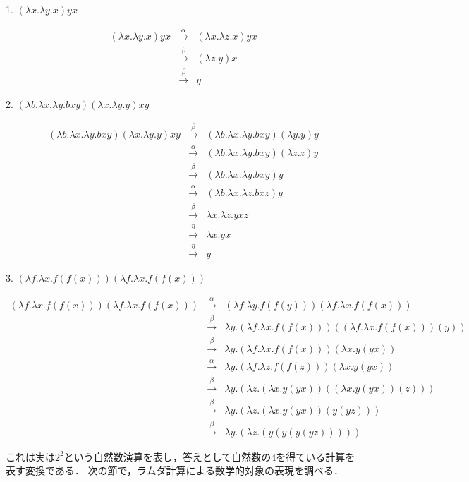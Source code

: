 \documentclass[uplatex, dvipdfmx]{jsreport}
\begin{document}
\begin{example}
    1. $(\lambda x.\lambda y.x)yx$

    \begin{eqnarray*}
        (\lambda x.\lambda y.x)yx &\xrightarrow{\alpha}& (\lambda x.\lambda z.x)yx \\
        &\xrightarrow{\beta}& (\lambda z.y)x \\
        &\xrightarrow{\beta}& y
    \end{eqnarray*}

    2. $(\lambda b.\lambda x.\lambda y.bxy)(\lambda x.\lambda y.y)xy$

    \begin{eqnarray*}
        (\lambda b.\lambda x.\lambda y.bxy)(\lambda x.\lambda y.y)xy &\xrightarrow{\beta}& (\lambda b.\lambda x.\lambda y.bxy)(\lambda y.y)y \\
        &\xrightarrow{\alpha}& (\lambda b.\lambda x.\lambda y.bxy)(\lambda z.z)y \\
        &\xrightarrow{\beta}& (\lambda b.\lambda x.\lambda y.bxy)y \\
        &\xrightarrow{\alpha}& (\lambda b.\lambda x.\lambda z.bxz)y \\
        &\xrightarrow{\beta}& \lambda x.\lambda z.yxz \\
        &\xrightarrow{\eta}& \lambda x.yx \\
        &\xrightarrow{\eta}& y
    \end{eqnarray*}

    3. $(\lambda f.\lambda x.f(f(x)))(\lambda f.\lambda x.f(f(x)))$

    \begin{eqnarray*}
        (\lambda f.\lambda x.f(f(x)))(\lambda f.\lambda x.f(f(x))) &\xrightarrow{\alpha}& (\lambda f.\lambda y.f(f(y)))(\lambda f.\lambda x.f(f(x))) \\
        &\xrightarrow{\beta}& \lambda y.(\lambda f.\lambda x.f(f(x)))((\lambda f.\lambda x.f(f(x)))(y)) \\
        &\xrightarrow{\beta}& \lambda y.(\lambda f.\lambda x.f(f(x)))(\lambda x.y(yx)) \\
        &\xrightarrow{\alpha}& \lambda y.(\lambda f.\lambda z.f(f(z)))(\lambda x.y(yx)) \\
        &\xrightarrow{\beta}& \lambda y.(\lambda z.(\lambda x.y(yx))((\lambda x.y(yx))(z))) \\
        &\xrightarrow{\beta}& \lambda y.(\lambda z.(\lambda x.y(yx))(y(yz))) \\
        &\xrightarrow{\beta}& \lambda y.(\lambda z.(y(y(y(yz)))))
    \end{eqnarray*}

    これは実は$2^2$という自然数演算を表し，答えとして自然数の$4$を得ている計算を表す変換である．
    次の節で，ラムダ計算による数学的対象の表現を調べる．
\end{example}
\end{document}
